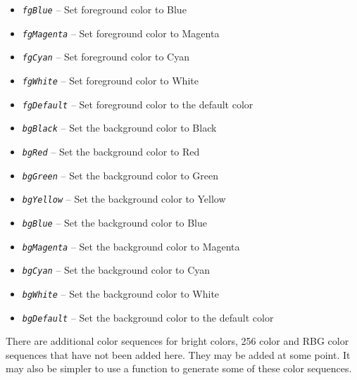 \documentclass[10pt, openany]{book}
\newcommand{\constant}[1]{\emph{\texttt{#1}}}
\begin{document}
\begin{itemize}
  \item \constant{fgBlue} -- Set foreground color to Blue
  \item \constant{fgMagenta} -- Set foreground color to Magenta
  \item \constant{fgCyan} -- Set foreground color to Cyan
  \item \constant{fgWhite} -- Set foreground color to White
  \item \constant{fgDefault} -- Set foreground color to the default color
  \item \constant{bgBlack} -- Set the background color to Black
  \item \constant{bgRed} -- Set the background color to Red
  \item \constant{bgGreen} -- Set the background color to Green
  \item \constant{bgYellow} -- Set the background color to Yellow
  \item \constant{bgBlue} -- Set the background color to Blue
  \item \constant{bgMagenta} -- Set the background color to Magenta
  \item \constant{bgCyan} -- Set the background color to Cyan
  \item \constant{bgWhite} -- Set the background color to White
  \item \constant{bgDefault} -- Set the background color to the default color
\end{itemize}
There are additional color sequences for bright colors, 256 color and RBG color sequences that have not been added here.  They may be added at some point.  It may also be simpler to use a function to generate some of these color sequences.
\end{document}
